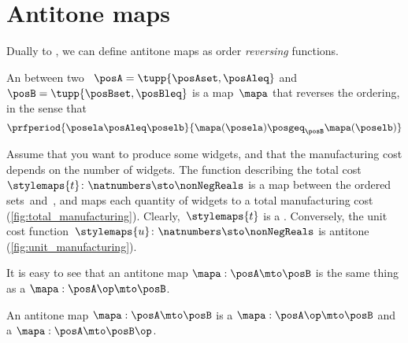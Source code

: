 \section{Antitone maps}

Dually to  , we can define antitone maps as order \emph{reversing} functions.

\begin{definition}
    \label{def:antitone}
    An \emph{} between two ~$\posA=\tupp{\posAset, \posAleq}$ and~$\posB=\tupp{\posBset, \posBleq}$ is a map~$\mapa$ that reverses the ordering, in the sense that
    \begin{equation}
        \prfperiod{
            \posela \posAleq \poselb
        }{
            \mapa(\posela) \posgeq_\posB \mapa(\poselb)
        }
    \end{equation}
\end{definition}

\begin{example}
    Assume that you want to produce some widgets, and that the manufacturing cost depends on the number of widgets.
    The function describing the total cost~$\stylemaps{t}\colon \natnumbers \sto \nonNegReals$ is a map between the ordered sets~\natnumbers and~\nonNegReals, and maps each quantity of widgets to a total manufacturing cost (\cref{fig:total_manufacturing}).
    Clearly,~$\stylemaps{t}$ is a .
    Conversely, the unit cost function~$\stylemaps{u}\colon \natnumbers \sto \nonNegReals$ is antitone (\cref{fig:unit_manufacturing}).
\end{example}

\begin{figure}[h!]
\end{figure}

It is easy to see that an antitone map $\mapa: \posA \mto \posB$ is the same thing as a  $\mapa: \posA\op \mto \posB$.

\begin{lemma}\label{lem:antitone-is-monotone}
    An antitone map  $\mapa: \posA \mto \posB$ is a  $\mapa: \posA\op \mto \posB$
    and a  $\mapa: \posA \mto \posB\op$.
\end{lemma}
